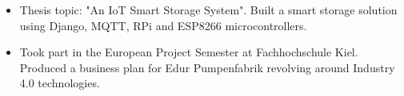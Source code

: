\documentclass[10pt,a4paper,ragged2e,withhyper]{altacv}
\begin{document}
\begin{paracol}{2}
\divider


\begin{itemize}
\item Thesis topic: "An IoT Smart Storage System". Built a smart storage solution using Django, MQTT, RPi and ESP8266 microcontrollers.
\item Took part in the European Project Semester at Fachhochschule Kiel. Produced a business plan for Edur Pumpenfabrik revolving around Industry 4.0 technologies.
\end{itemize}

\end{paracol}
\end{document}
